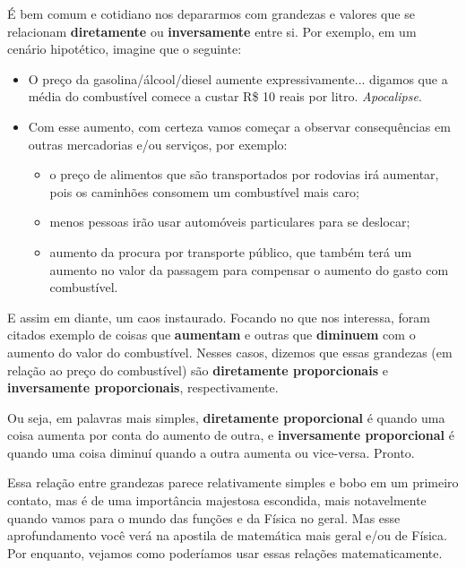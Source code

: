 É bem comum e cotidiano nos depararmos com grandezas e valores que se relacionam \textbf{diretamente} ou \textbf{inversamente} entre si. Por exemplo, em um cenário hipotético, imagine que o seguinte: 

\begin{itemize}
    \item O preço da gasolina/álcool/diesel aumente expressivamente... digamos que a média do combustível comece a custar R\$ 10 reais por litro. \textit{Apocalipse}.
    \item Com esse aumento, com certeza vamos começar a observar consequências em outras mercadorias e/ou serviços, por exemplo:
    \begin{itemize}
        \item o preço de alimentos que são transportados por rodovias irá aumentar, pois os caminhões consomem um combustível mais caro;
        \item menos pessoas irão usar automóveis particulares para se deslocar;
        \item aumento da procura por transporte público, que também terá um aumento no valor da passagem para compensar o aumento do gasto com combustível.
    \end{itemize}
\end{itemize}

E assim em diante, um caos instaurado. Focando no que nos interessa, foram citados exemplo de coisas que \textbf{aumentam} e outras que \textbf{diminuem} com o aumento do valor do combustível. Nesses casos, dizemos que essas grandezas (em relação ao preço do combustível) são \textbf{diretamente proporcionais} e \textbf{inversamente proporcionais}, respectivamente.

Ou seja, em palavras mais simples, \textbf{diretamente proporcional} é quando uma coisa aumenta por conta do aumento de outra, e \textbf{inversamente proporcional} é quando uma coisa diminuí quando a outra aumenta ou vice-versa. Pronto.

Essa relação entre grandezas parece relativamente simples e bobo em um primeiro contato, mas é de uma importância majestosa escondida, mais notavelmente quando vamos para o mundo das funções e da Física no geral. Mas esse aprofundamento você verá na apostila de matemática mais geral e/ou de Física. Por enquanto, vejamos como poderíamos usar essas relações matematicamente.

